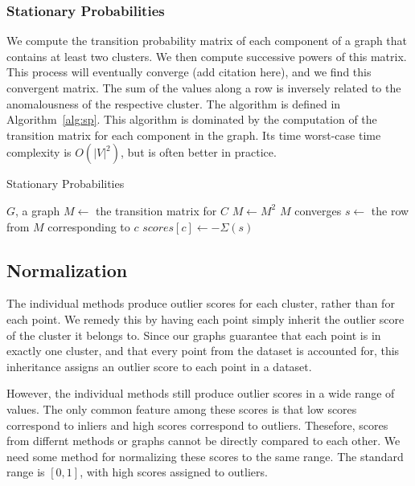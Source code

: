 \subsubsection{Stationary Probabilities}
We compute the transition probability matrix of each component of a graph that contains at least two clusters.
We then compute successive powers of this matrix. %
This process will eventually converge (add citation here), and we find this convergent matrix.
The sum of the values along a row is inversely related to the anomalousness of the respective cluster. The algorithm is defined in Algorithm~\ref{alg:sp}.
This algorithm is dominated by the computation of the transition matrix for each component in the graph.
Its time worst-case time complexity is $O(|V|^2)$, but is often better in practice.

\begin{algorithm}[h]
    \caption{Stationary Probabilities}
    \label{alg:sp}
\begin{algorithmic}[1]
    \REQUIRE $G$, a graph
        \STATE $M \gets$ the transition matrix for $C$
        \REPEAT
            \STATE $M \gets M^2$
        \UNTIL $M$ converges
            \STATE $s \gets $ the row from $M$ corresponding to $c$
            \STATE $scores[c] \gets -\Sigma(s)$ 
        \ENDFOR
    \ENDFOR
\end{algorithmic}
\end{algorithm}




\subsection{Normalization}\label{subsec:methods:normalization}
The individual methods produce outlier scores for each cluster, rather than for each point.
We remedy this by having each point simply inherit the outlier score of the cluster it belongs to.
Since our graphs guarantee that each point is in exactly one cluster, and that every point from the dataset is accounted for, this inheritance assigns an outlier score to each point in a dataset.

However, the individual methods still produce outlier scores in a wide range of values.
The only common feature among these scores is that low scores correspond to inliers and high scores correspond to outliers.
Thesefore, scores from differnt methods or graphs cannot be directly compared to each other.
We need some method for normalizing these scores to the same range.
The standard range is $[0, 1]$, with high scores assigned to outliers.

